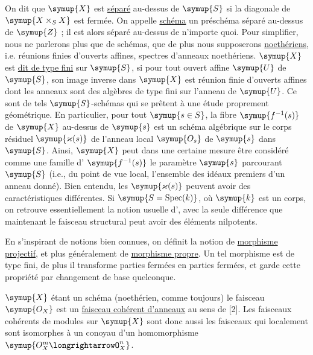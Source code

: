 On dit que $\symup{X}$ est \uline{séparé} au-dessus de $\symup{S}$ si la diagonale de
$\symup{X\times_S X}$ est fermée. On appelle \uline{schéma} un préschéma séparé
au-dessus de $\symup{Z}$ ; il est alors séparé au-dessus de n'importe quoi.
Pour simplifier, nous ne parlerons plus que de schémas, que de plus nous
supposerons \uline{noethériens}, i.e. réunions finies d'ouverts affines, spectres
d'anneaux noethériens. $\symup{X}$ est \uline{dit de type fini} sur $\symup{S}$, si pour tout
ouvert affine $\symup{U}$ de $\symup{S}$, son image inverse dans $\symup{X}$ est réunion finie d'ouverts
affines dont les anneaux sont des algèbres de type fini sur l'anneau de $\symup{U}$. Ce
sont de tels $\symup{S}$-schémas qui se prêtent à une étude proprement géométrique. En
particulier, pour tout $\symup{s\in S}$, la fibre $\symup{f^{-1}(s)}$ de $\symup{X}$ au-dessus de $\symup{s}$
est un schéma algébrique sur le corps résiduel $\symup{\varkappa(s)}$ de l'anneau local
$\symup{O_s}$ de $\symup{s}$ dans $\symup{S}$. Ainsi, $\symup{X}$ peut dans une certaine mesure être
considéré comme une famille d' $\symup{f^{-1}(s)}$ le paramètre
$\symup{s}$ parcourant $\symup{S}$ (i.e., du point de vue local, l'ensemble des idéaux premiers
d'un anneau donné). Bien entendu, les $\symup{\varkappa(s)}$ peuvent avoir des
caractéristiques différentes. Si $\symup{S=\operatorname{Spec}(k)}$, où $\symup{k}$ est un
corps, on retrouve essentiellement la notion usuelle d',
avec la seule différence que maintenant le faisceau structural peut avoir des
éléments nilpotents.

En s'inspirant de notions bien connues, on définit la notion de
\uline{morphisme projectif}, et plus généralement de \uline{morphisme propre}. Un
tel morphisme est de type fini, de plus il transforme parties fermées en
parties fermées, et garde cette propriété par changement de base quelconque.

$\symup{X}$ étant un schéma (noethérien, comme toujours) le faisceau $\symup{O_X}$ est un
\uline{faisceau cohérent d'anneaux} au sens de [2]. Les faisceaux cohérents de
modules sur $\symup{X}$ sont donc aussi les faisceaux qui localement sont isomorphes à
un conoyau d'un homomorphisme $\symup{O_X^{m}\longrightarrowO_X^{n}}$.


